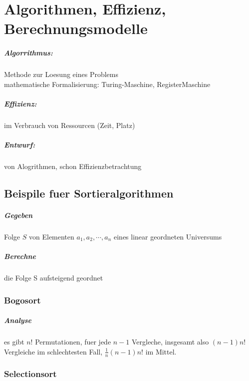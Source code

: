 \chapter{Algorithmen, Effizienz, Berechnungsmodelle}

\paragraph{Algorrithmus:}
	Methode zur Loesung eines Problems
	\\mathematische Formalisierung: Turing-Maschine, RegisterMaschine

\paragraph{Effizienz:}
	im Verbrauch von Ressourcen (Zeit, Platz)

\paragraph{Entwurf:}
	von Alogrithmen, schon Effizienzbetrachtung

\section{Beispile fuer Sortieralgorithmen}

\paragraph{Gegeben} Folge $S$ von Elementen $a_1, a_2, \cdots, a_n$ eines
linear geordneten Universums
\paragraph{Berechne} die Folge S aufsteigend geordnet

\subsection{Bogosort}
	\paragraph{Analyse}
	es gibt $n!$ Permutationen, fuer jede $n-1$ Vergleche,
	insgesamt also $(n-1)n!$ Vergleiche im schlechtesten Fall,
	$\frac{1}{n}(n-1)n!$ im Mittel.
\subsection{Selectionsort}
